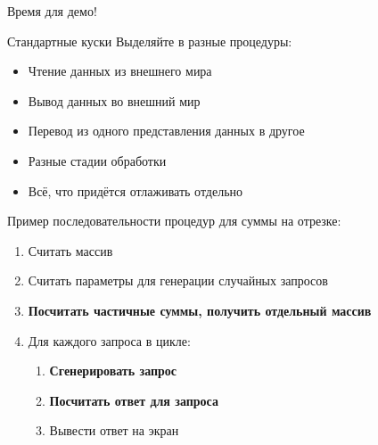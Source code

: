 \begin{frame}{Время для демо!}
\end{frame}

\begin{frame}{Стандартные куски}
	Выделяйте в разные процедуры:
	\begin{itemize}
	\item Чтение данных из внешнего мира
	\item Вывод данных во внешний мир
	\item Перевод из одного представления данных в другое
	\item Разные стадии обработки
	\item Всё, что придётся отлаживать отдельно
	\end{itemize}
	
	Пример последовательности процедур для суммы на отрезке:
	\begin{enumerate}
	\item Считать массив
	\item Считать параметры для генерации случайных запросов
	\item \textbf{Посчитать частичные суммы, получить отдельный массив}
	\item Для каждого запроса в цикле:
		\begin{enumerate}
		\item \textbf{Сгенерировать запрос}
		\item \textbf{Посчитать ответ для запроса}
		\item Вывести ответ на экран
		\end{enumerate}
	\end{enumerate}
\end{frame}